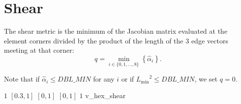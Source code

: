 \section{Shear\label{s:hex-shear}}

The shear metric is the minimum of the Jacobian matrix
evaluated at the element corners divided by the product of the length of the 3
edge vectors meeting at that corner:
\[
  q = \min_{i\in\{0,1,\ldots,8\}}
  \left\{
    \hat \alpha_i
  \right\}.
\]

Note that if $\hat \alpha_i \leq DBL\_MIN$ for any $i$ or if ${L_{\min}}^2 \leq DBL\_MIN$,
we set $q = 0$.

%
{$1$}%
{$[0.3,1]$}%
{$[0,1]$}%
{$[0,1]$}%
{$1$}%
{\cite{knu:03}}%
{v\_hex\_shear}%
